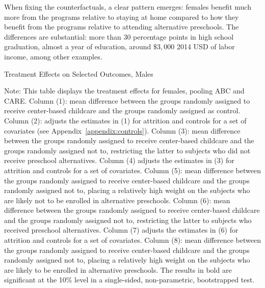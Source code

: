 \noindent When fixing the counterfactuals, a clear pattern emerges: females benefit much more from the programs relative to staying at home compared to how they benefit from the programs relative to attending alternative preschools. The differences are substantial: more than $30$ percentage points in high school graduation, almost a year of education, around $\$ 3,000$ 2014 USD of labor income, among other examples.

\begin{table}[H] 
\begin{threeparttable}
\caption{Treatment Effects on Selected Outcomes, Males}
\label{table:males}
\centering
\scalebox{.97}{ 
}
\begin{tablenotes}
\footnotesize
\item Note: This table displays the treatment effects for females, pooling ABC and CARE. Column (1): mean difference between the groups randomly assigned to receive center-based childcare and the groups randomly assigned as control. Column (2): adjusts the estimates in (1) for attrition and controls for a set of covariates (see Appendix~\ref{appendix:controls}). Column (3): mean difference between the groups randomly assigned to receive center-based childcare and the groups randomly assigned not to, restricting the latter to subjects who did not receive preschool alternatives. Column (4) adjusts the estimates in (3) for attrition and controls for a set of covariates. Column (5): mean difference between the groups randomly assigned to receive center-based childcare and the groups randomly assigned not to, placing a relatively high weight on the subjects who are likely not to be enrolled in alternative preschools. Column (6): mean difference between the groups randomly assigned to receive center-based childcare and the groups randomly assigned not to, restricting the latter to subjects who received preschool alternatives. Column (7) adjusts the estimates in (6) for attrition and controls for a set of covariates. Column (8): mean difference between the groups randomly assigned to receive center-based childcare and the groups randomly assigned not to, placing a relatively high weight on the subjects who are likely to be enrolled in alternative preschools. The results in bold are significant at the 10\% level in a single-sided, non-parametric, bootstrapped test.
\end{tablenotes}
\end{threeparttable}
\end{table}


